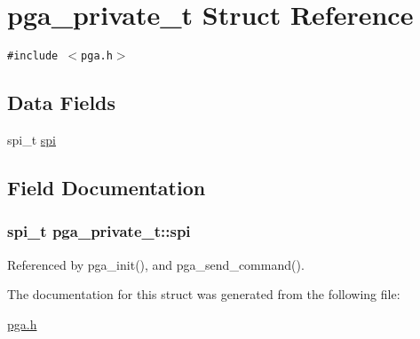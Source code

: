 \hypertarget{structpga__private__t}{
\section{pga\_\-private\_\-t Struct Reference}
\label{structpga__private__t}
}
{\tt \#include $<$pga.h$>$}

\subsection*{Data Fields}
\begin{CompactItemize}
\item 
spi\_\-t \hyperlink{structpga__private__t_484afbb7de4e1e540f2ac3cc5338b539}{spi}
\end{CompactItemize}


\subsection{Field Documentation}
\hypertarget{structpga__private__t_484afbb7de4e1e540f2ac3cc5338b539}{
\subsubsection{\setlength{\rightskip}{0pt plus 5cm}spi\_\-t {\bf pga\_\-private\_\-t::spi}}}
\label{structpga__private__t_484afbb7de4e1e540f2ac3cc5338b539}




Referenced by pga\_\-init(), and pga\_\-send\_\-command().

The documentation for this struct was generated from the following file:\begin{CompactItemize}
\item 
\hyperlink{pga_8h}{pga.h}\end{CompactItemize}

